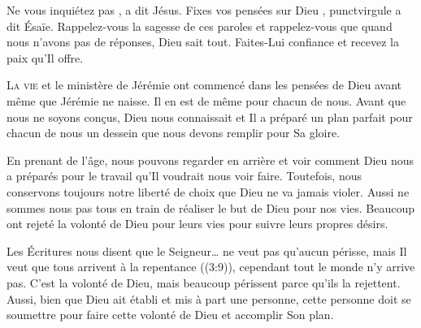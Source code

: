 \Og Ne vous inquiétez pas \Fg{}, 
 a dit Jésus.
 \Og Fixes vos 
 pensées sur Dieu \Fg{}, punct{virgule}
 a dit Ésaïe.
 Rappelez-vous la sagesse de ces paroles et rappelez-vous que
 quand nous n'avons pas de réponses, Dieu sait tout.
 Faites-Lui confiance et recevez la paix qu'Il offre.

\dvrule







\lettrine{L}{a vie} et le ministère de Jérémie ont commencé
 dans les pensées de Dieu avant même que Jérémie ne naisse.
 Il en est de même pour chacun de nous. Avant que nous ne soyons con\c{c}us,
 Dieu nous connaissait et Il a préparé un plan parfait pour chacun de nous
 \ocadr un dessein que nous devons remplir pour Sa gloire. 

En prenant de l'âge, nous pouvons regarder en arrière et voir
 comment Dieu nous a préparés pour le travail qu'Il voudrait nous voir faire.
 Toutefois, nous conservons toujours notre liberté de choix que Dieu
 ne va jamais violer. Aussi ne sommes nous pas tous en train de réaliser
 le but de Dieu pour nos vies. Beaucoup ont rejeté la volonté de Dieu
 pour leurs vies pour suivre leurs propres désirs. 


Les Écritures nous disent que \Og le 
 Seigneur\dots{} ne veut pas qu'aucun périsse, mais Il veut que tous arrivent
 à la repentance \Fg{} ((3:9)), cependant tout le monde
 n'y arrive pas. C'est la volonté de Dieu, mais beaucoup périssent
 parce qu'ils la rejettent. Aussi, bien que Dieu ait établi et mis à part
 une personne, cette personne doit se soumettre pour faire cette volonté
 de Dieu et accomplir Son plan. 

